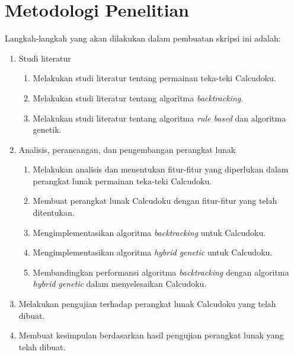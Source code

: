 \section{Metodologi Penelitian}
\label{sec:metlit}
Langkah-langkah yang akan dilakukan dalam pembuatan skripsi ini adalah:
\begin{enumerate}
\item Studi literatur
\begin{enumerate}
\item Melakukan studi literatur tentang permainan teka-teki Calcudoku.
\item Melakukan studi literatur tentang algoritma \textit{backtracking}.
\item Melakukan studi literatur tentang algoritma \textit{rule based} dan algoritma genetik.
\end{enumerate}
\item Analisis, perancangan, dan pengembangan perangkat lunak
\begin{enumerate}
\item Melakukan analisis dan menentukan fitur-fitur yang diperlukan dalam perangkat lunak permainan teka-teki Calcudoku.
\item Membuat perangkat lunak Calcudoku dengan fitur-fitur yang telah ditentukan. 
\item Mengimplementasikan algoritma \textit{backtracking} untuk Calcudoku.
\item Mengimplementasikan algoritma \textit{hybrid genetic} untuk Calcudoku.
\item Membandingkan performansi algoritma \textit{backtracking} dengan algoritma \textit{hybrid genetic} dalam menyelesaikan Calcudoku.
\end{enumerate}
\item Melakukan pengujian terhadap perangkat lunak Calcudoku yang telah dibuat.
\item Membuat kesimpulan berdasarkan hasil pengujian perangkat lunak yang telah dibuat.
\end{enumerate}

